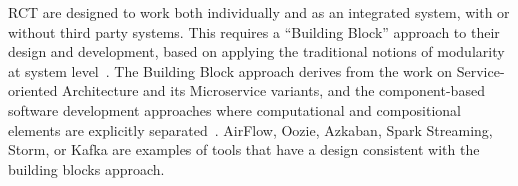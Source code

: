 \documentclass[preprint,12pt, a4paper]{elsarticle}
\begin{document}




RCT are designed to work both individually and as an integrated system, with
or without third party systems. This requires a ``Building Block'' approach
to their design and development, based on applying the traditional notions of
modularity at system level~\cite{turilli2019middleware}. The Building Block
approach derives from the work on Service-oriented Architecture and its
Microservice variants, and the component-based software development
approaches where computational and compositional elements are explicitly
separated~\cite{batory1992design,garlan1995architectural,lenz1987software,clemens1998component,schneider2000components}.
AirFlow, Oozie, Azkaban, Spark Streaming, Storm, or Kafka are examples of
tools that have a design consistent with the building blocks approach.


\end{document}
